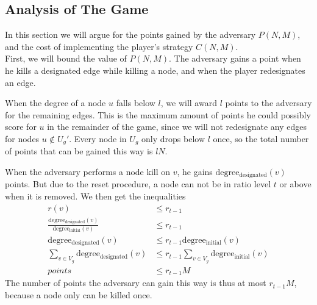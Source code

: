 \subsection{Analysis of The Game}
\label{KRGameAnalysisSection}


In this section we will argue for the points gained by the adversary $P(N, M)$, and the cost of implementing the player's strategy $C(N, M)$.\\

First, we will bound the value of $P(N, M)$.
The adversary gains a point when he kills a designated edge while killing a node, and when the player redesignates an edge.

When the degree of a node $u$ falls below $l$, we will award $l$ points to the adversary for the remaining edges.
This is the maximum amount of points he could possibly score for $u$ in the remainder of the game, since we will not redesignate any edges for nodes $u \not\in U_g'$. 
Every node in $U_g$ only drops below $l$ once, so the total number of points that can be gained this way is $l N$.

When the adversary performs a node kill on $v$, he gains $\mathrm{degree_{designated}}(v)$ points. 
But due to the reset procedure, a node can not be in ratio level $t$ or above when it is removed. 
We then get the inequalities
\begin{align*}
r(v) &\leq r_{t-1}\\
\frac{\mathrm{degree_{designated}}(v)}{\mathrm{degree_{initial}}(v)} &\leq r_{t-1}\\ 
\mathrm{degree_{designated}}(v) &\leq r_{t-1} \mathrm{degree_{initial}}(v)\\ 
\sum\limits_{v\in V_g}{\mathrm{degree_{designated}}(v)} &\leq r_{t-1}\sum\limits_{v\in V_g}{\mathrm{degree_{initial}}(v)}\\ 
points &\leq r_{t-1} M
\end{align*}
The number of points the adversary can gain this way is thus at most $r_{t-1}M$, because a node only can be killed once.

